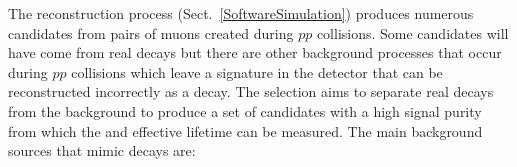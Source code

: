 
The reconstruction process (Sect.~\ref{SoftwareSimulation}) produces numerous \bmumu candidates from pairs of muons created during $pp$ collisions. Some candidates will have come from real \bmumu decays but there are other background processes that occur during $pp$ collisions which leave a signature in the detector that can be reconstructed incorrectly as a \bmumu decay. %
The selection aims to separate real \bmumu decays from the background to produce a set of \bmumu candidates with a high signal purity from which the \bmumu \BF and \bsmumu effective lifetime can be measured.
The main background sources that mimic \bmumu decays are:
